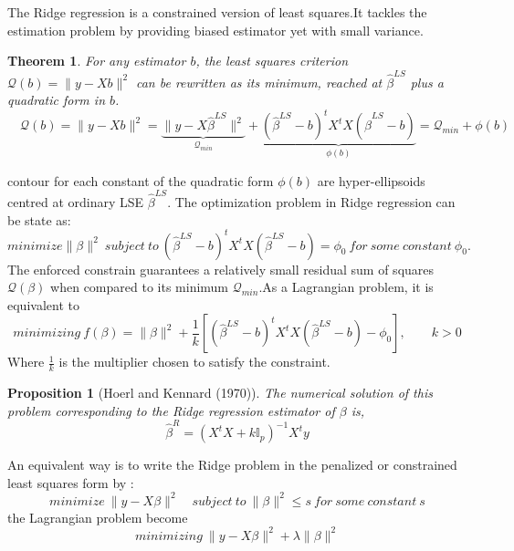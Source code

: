 \documentclass[12pt]{report}
\newtheorem{theoreme}{Theorem}[section] %
\newtheorem {proposition}{Proposition}[section]  %
\begin{document}
The Ridge regression is a constrained version of least squares.It tackles the estimation problem by providing biased estimator yet with small variance.
	\begin{theoreme}
	For any estimator $b$, the least squares criterion $	\mathcal{Q}(b)= \parallel y-Xb \parallel^{2}$ can be rewritten as its minimum, reached at $\hat{\beta}^{LS}$ plus a quadratic form in $b$.
		\begin{equation}
		\quad  \mathcal{Q}(b)=\parallel y-Xb \parallel^{2}=\underbrace{\parallel y-X\hat{\beta}^{LS}  \parallel^{2}}_{\mathcal{Q}_{min}}+\underbrace{( \hat{\beta}^{LS}-b)^{t}X^{t}X( \hat{\beta}^{LS}-b)}_{\phi(b)}=\mathcal{Q}_{min} + \phi(b)
		\label{f10}
	\end{equation} 
\end{theoreme}
	contour for each constant of the quadratic form $\phi(b)$ are hyper-ellipsoids centred at ordinary LSE $\hat{\beta}^{LS}$.
		The optimization problem in Ridge regression can be state as:
	$$ minimize \parallel \beta \parallel^{2}\ subject\ to\ ( \hat{\beta}^{LS}-b)^{t}X^{t}X( \hat{\beta}^{LS}-b)=\phi_{0}\ for\ some\ constant\ \phi_{0}.$$
	The enforced constrain guarantees a relatively small residual sum of squares $\mathcal{Q}(\beta)$ when compared to its minimum $\mathcal{Q}_{min}$.As a Lagrangian problem, it is equivalent to 
	$$ minimizing\ f(\beta) = \parallel \beta \parallel^{2} + \frac{1}{k}[( \hat{\beta}^{LS}-b)^{t}X^{t}X( \hat{\beta}^{LS}-b)-\phi_{0}],\qquad k>0$$
	Where $\frac{1}{k}$ is the multiplier chosen to satisfy the constraint.
	\begin{proposition}[Hoerl and Kennard (1970)]
		The numerical solution of this problem corresponding to the Ridge regression estimator of $\beta$ is,
		\begin{equation}
			\hat{\beta}^{R}=(X^{t}X+k\mathbb{I}_{p})^{-1}X^{t}y
			\label{f11}
		\end{equation}
	\end{proposition}
	An equivalent way is to write the Ridge problem in the penalized or constrained least squares form by :
\begin{equation}
	minimize\  \parallel y- X\beta \parallel^{2}\quad subject\ to\ \parallel \beta \parallel^{2}\leq s\ for\ some\ constant\ s
	\label{u1}
\end{equation}
the Lagrangian problem become
\begin{equation}
	minimizing\ \parallel y- X\beta \parallel^{2}+\lambda\parallel \beta \parallel^{2}
	\label{f12}
\end{equation} 
\end{document}
